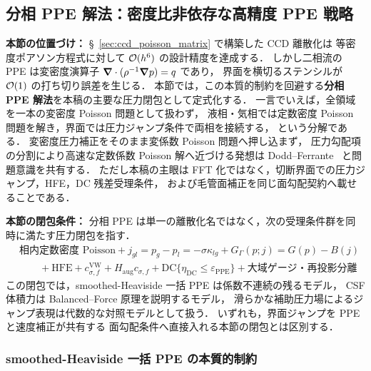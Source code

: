 %
\subsection{分相 PPE 解法：密度比非依存な高精度 PPE 戦略}
\label{sec:split_ppe_framework}
\label{sec:split_ppe_motivation}%
\label{sec:gfm_numerical_motivation}%

\noindent\textbf{本節の位置づけ：}
§~\ref{sec:ccd_poisson_matrix} で構築した CCD 離散化は
等密度ポアソン方程式に対して $\mathcal{O}(h^6)$ の設計精度を達成する．
しかし二相流の PPE は変密度演算子 $\bm{\nabla}\cdot(\rho^{-1}\bm{\nabla} p) = q$ であり，
界面を横切るステンシルが $\mathcal{O}(1)$ の打ち切り誤差を生じる．
本節では，この本質的制約を回避する\textbf{分相 PPE 解法}を本稿の主要な圧力閉包として定式化する．
一言でいえば，全領域を一本の変密度 Poisson 問題として扱わず，
液相・気相では定数密度 Poisson 問題を解き，界面では圧力ジャンプ条件で両相を接続する，
という分解である．
変密度圧力補正をそのまま変係数 Poisson 問題へ押し込まず，
圧力勾配項の分割により高速な定数係数 Poisson 解へ近づける発想は
Dodd--Ferrante~\cite{DoddFerrante2014} と問題意識を共有する．
ただし本稿の主眼は FFT 化ではなく，切断界面での圧力ジャンプ，HFE，DC 残差受理条件，
および毛管面補正を同じ面勾配契約へ載せることである．

\noindent\textbf{本節の閉包条件：}
分相 PPE は単一の離散化名ではなく，次の受理条件群を同時に満たす圧力閉包を指す．
\[
\begin{aligned}
  &\text{相内定数密度 Poisson}
  + j_{gl}=p_g-p_l=-\sigma\kappa_{lg}
  + G_\Gamma(p;j)=G(p)-B(j)\\
  &\qquad
  + \mathrm{HFE}
  + c_{\sigma,f}^{\mathrm{VW}} + H_{\mathrm{aug}}c_{\sigma,f}
  + \mathrm{DC}\{\eta_{\mathrm{DC}}\le\varepsilon_{\mathrm{PPE}}\}
  + \text{大域ゲージ・再投影分離}
\end{aligned}
\]
この閉包では，smoothed-Heaviside 一括 PPE は係数不連続の残るモデル，
CSF 体積力は Balanced--Force 原理を説明するモデル，
滑らかな補助圧力場によるジャンプ表現は代数的な対照モデルとして扱う．
いずれも，界面ジャンプを PPE と速度補正が共有する
面勾配条件へ直接入れる本節の閉包とは区別する．

\subsubsection{smoothed-Heaviside 一括 PPE の本質的制約}
\label{sec:monolithic_ppe_limitation}

